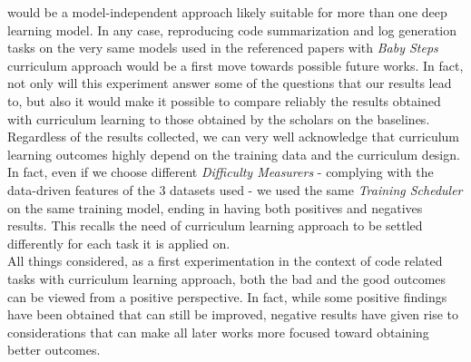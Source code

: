 would be a model-independent approach likely suitable for more than one deep learning model.
In any case, reproducing code summarization and log generation tasks on the very same models used in the referenced papers with
\textit{Baby Steps} curriculum approach would be a first move towards possible future works. In fact, not only will this experiment answer 
some of the questions that our results lead to, but also it would make it possible to compare reliably the results obtained with curriculum 
learning to those obtained by the scholars on the baselines.\\
Regardless of the results collected, we can very well acknowledge that curriculum learning outcomes highly depend on the training data 
and the curriculum design. In fact, even if we choose different \textit{Difficulty Measurers} - 
complying with the data-driven features of the 3 datasets used - we used the same \textit{Training Scheduler} on the same training model, ending in having both positives and negatives results.
This recalls the need of curriculum learning approach to be settled differently for each task it is applied on.\\
All things considered, as a first experimentation in the context of code related tasks with curriculum learning approach, both the bad and the good
outcomes can be viewed from a positive perspective. In fact, while some positive findings have been obtained that can still be improved,
negative results have given rise to considerations that can make all later works more focused toward obtaining better outcomes.


